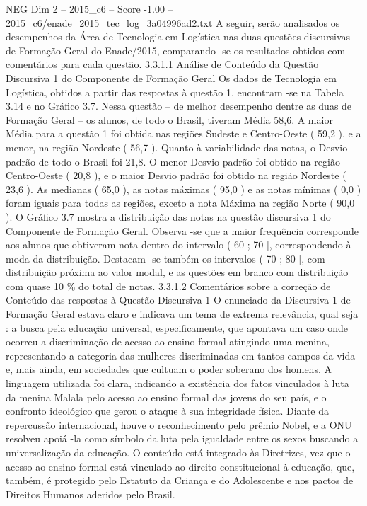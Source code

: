 \begin{textsample}{NEG Dim 2 – 2015\_c6 – Score -1.00 – 2015\_c6/enade\_2015\_tec\_log\_3a04996ad2.txt}
A seguir, serão analisados os desempenhos da Área de Tecnologia em Logística nas duas questões discursivas de Formação Geral do Enade/2015, comparando -se os resultados obtidos com comentários para cada questão. 3.3.1.1 Análise de Conteúdo da Questão Discursiva 1 do Componente de Formação Geral Os dados de Tecnologia em Logística, obtidos a partir das respostas à questão 1, encontram -se na Tabela 3.14 e no Gráfico 3.7.
Nessa questão – de melhor desempenho dentre as duas de Formação Geral – os alunos, de todo o Brasil, tiveram Média 58,6.
A maior Média para a questão 1 foi obtida nas regiões Sudeste e Centro-Oeste ( 59,2 ), e a menor, na região Nordeste ( 56,7 ).
Quanto à variabilidade das notas, o Desvio padrão de todo o Brasil foi 21,8.
O menor Desvio padrão foi obtido na região Centro-Oeste ( 20,8 ), e o maior Desvio padrão foi obtido na região Nordeste ( 23,6 ).
As medianas ( 65,0 ), as notas máximas ( 95,0 ) e as notas mínimas ( 0,0 ) foram iguais para todas as regiões, exceto a nota Máxima na região Norte ( 90,0 ).
O Gráfico 3.7 mostra a distribuição das notas na questão discursiva 1 do Componente de Formação Geral.
Observa -se que a maior frequência corresponde aos alunos que obtiveram nota dentro do intervalo ( 60 ; 70 ], correspondendo à moda da distribuição.
Destacam -se também os intervalos ( 70 ; 80 ], com distribuição próxima ao valor modal, e as questões em branco com distribuição com quase 10 \% do total de notas. 3.3.1.2 Comentários sobre a correção de Conteúdo das respostas à Questão Discursiva 1 O enunciado da Discursiva 1 de Formação Geral estava claro e indicava um tema de extrema relevância, qual seja : a busca pela educação universal, especificamente, que apontava um caso onde ocorreu a discriminação de acesso ao ensino formal atingindo uma menina, representando a categoria das mulheres discriminadas em tantos campos da vida e, mais ainda, em sociedades que cultuam o poder soberano dos homens.
A linguagem utilizada foi clara, indicando a existência dos fatos vinculados à luta da menina Malala pelo acesso ao ensino formal das jovens do seu país, e o confronto ideológico que gerou o ataque à sua integridade física.
Diante da repercussão internacional, houve o reconhecimento pelo prêmio Nobel, e a ONU resolveu apoiá -la como símbolo da luta pela igualdade entre os sexos buscando a universalização da educação.
O conteúdo está integrado às Diretrizes, vez que o acesso ao ensino formal está vinculado ao direito constitucional à educação, que, também, é protegido pelo Estatuto da Criança e do Adolescente e nos pactos de Direitos Humanos aderidos pelo Brasil.

\end{textsample}
